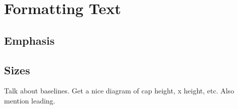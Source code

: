 \chapter{Formatting Text}

\section{Emphasis}

\section{Sizes}

Talk about baselines.
Get a nice diagram of cap height, x height, etc.
Also mention leading.
